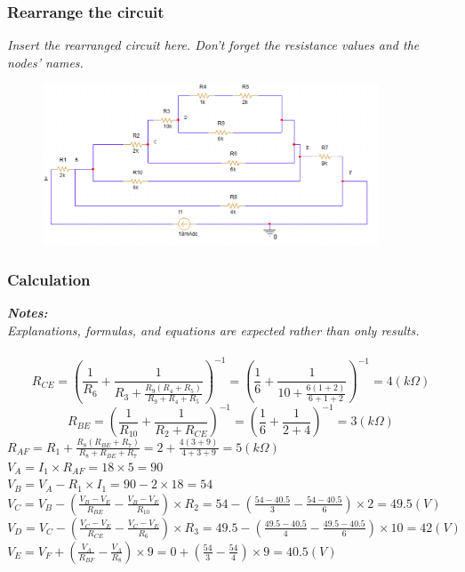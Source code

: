 \subsubsection{Rearrange the circuit}
\textit{Insert the rearranged circuit here. Don't forget the resistance values and the nodes' names.}
\begin{figure}[H]
    \centering
    \includegraphics[width = 10cm]{source/picture/bai_1/ex3_rearrange.png}
\end{figure}
\newpage

\subsubsection{Calculation}
\textit{\textbf{Notes:}}\\
\textit{Explanations, formulas, and equations are expected rather than only results.}\\
\\
$$R_{CE} = \left(\frac{1}{R_6}+\frac{1}{R_3 + \frac{R_9(R_4+R_5)}{R_9+R_4+R_5}}\right)^{-1} = \left(\frac{1}{6}+\frac{1}{10 + \frac{6(1+2)}{6+1+2}}\right)^{-1} = 4(k\Omega)$$
$$R_{BE} = \left(\frac{1}{R_10} + \frac{1}{R_2 + R_{CE}}\right)^{-1} = \left(\frac{1}{6}+\frac{1}{2+4}\right)^{-1} = 3(k\Omega)$$
$R_{AF} =R_1 + \frac{R_8(R_{BE}+R_7)}{R_8 + R_{BE} + R_7} = 2 + \frac{4(3+9)}{4+3+9} = 5(k\Omega)$ \bigskip\\
$V_A = I_1 \times R_{AF} = 18 \times 5 = 90 $ \bigskip\\
$V_B = V_A - R_1 \times I_1 = 90 -2 \times 18 = 54$ \bigskip\\
$V_C = V_B - \left(\frac{V_B-V_E}{R_{BE}} - \frac{V_B-V_E}{R_{10}}\right) \times R_2 = 54 - \left(\frac{54-40.5}{3} - \frac{54-40.5}{6}\right) \times 2 = 49.5 (V)$ \bigskip\\
$V_D = V_C - \left(\frac{V_C-V_E}{R_{CE}} - \frac{V_C-V_E}{R_{6}}\right) \times R_3 = 49.5 - \left(\frac{49.5-40.5}{4} - \frac{49.5-40.5}{6}\right) \times  10= 42 (V)$ \bigskip\\
$V_E = V_F + \left(\frac{V_A}{R_{BF}} - \frac{V_A}{R_8}\right) \times 9 = 0 + \left(\frac{54}{3} - \frac{54}{4}\right) \times 9 = 40.5 (V)$ \bigskip\\

